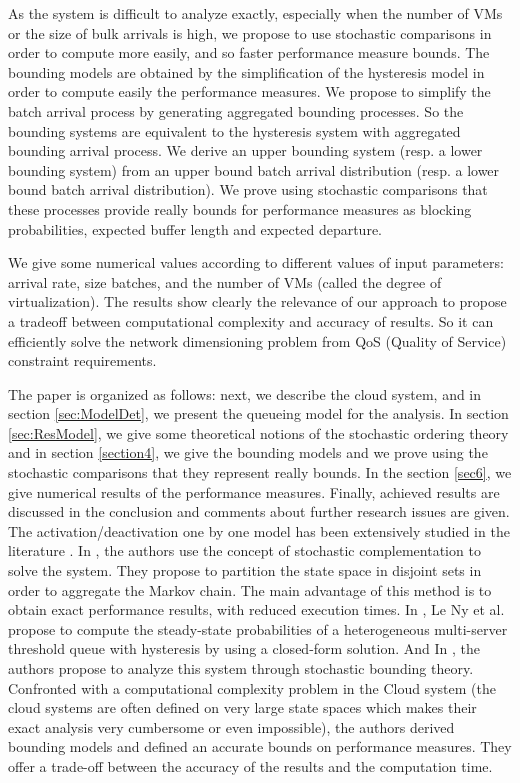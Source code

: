 \documentclass[conference]{IEEEtran}
\begin{document}
As the system is difficult  to analyze exactly, especially when the number of VMs or the size of bulk arrivals is high, we propose to use stochastic 
comparisons in order to compute more easily, and so faster performance measure bounds.
The bounding models are obtained by the simplification  of the hysteresis model  in order to compute easily the performance measures. We propose to 
simplify the batch arrival process by  generating  aggregated bounding  processes. So  the bounding systems are equivalent to the hysteresis system 
with aggregated bounding arrival process. We derive an upper bounding system (resp. a lower bounding system) from an upper bound batch arrival 
distribution (resp. a lower bound batch arrival distribution). We prove using stochastic comparisons that these processes provide really bounds 
for performance measures as blocking probabilities, expected buffer length and expected departure.

We give some numerical values according to different values of input parameters: arrival rate, size batches,  and the number of VMs (called the degree 
of virtualization). The results show clearly the relevance of our approach to propose a tradeoff between computational complexity and accuracy of 
results. So it can efficiently solve the network dimensioning problem from QoS (Quality of Service) constraint requirements.

The paper is organized as follows: next, we describe the cloud system, and in section \ref{sec:ModelDet}, we present the queueing model for the analysis. 
In section \ref{sec:ResModel}, we give some theoretical notions of the stochastic ordering theory and in section  \ref{section4}, we give the bounding 
models and we prove using the stochastic comparisons that they represent really bounds. In the  section \ref{sec6}, we give numerical results of the 
performance measures. Finally, achieved results are discussed in the conclusion and comments about further research issues  are given.
The activation/deactivation one by one model has been extensively studied in the literature  \cite{lui1999stochastic,le2000simple,ait2015threshold}. 
In  \cite{lui1999stochastic}, the authors use the concept of stochastic complementation to solve the system. They propose to partition the state space 
in disjoint sets in order to aggregate the Markov chain.  The main advantage of this method is to obtain exact performance results, with reduced 
execution times. In \cite{le2000simple}, Le Ny et al. propose to compute the steady-state probabilities of a heterogeneous multi-server threshold queue
with hysteresis by using a closed-form solution. And In  \cite{ait2015threshold}, the authors propose to analyze this system through stochastic 
bounding theory. Confronted with a computational complexity problem in the Cloud system (the cloud systems are often defined on very large state 
spaces which makes their exact analysis very cumbersome or even impossible), the authors derived bounding models and defined an accurate bounds on 
performance measures. They offer a trade-off between the accuracy of the results and the computation time.
\end{document}
